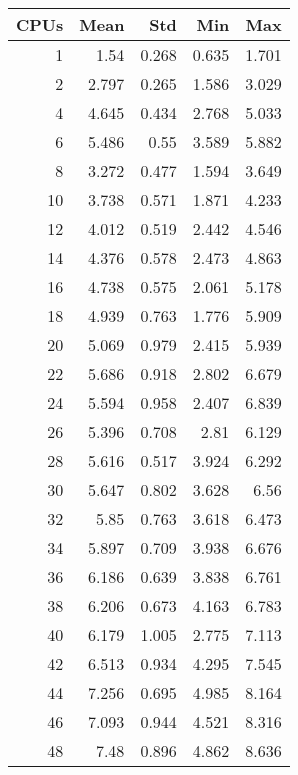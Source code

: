 \begin{table}[htbp]
  \centering
  \begin{minipage}{.45\textwidth}
    \centering
    \scriptsize
\begin{tabular}{rrrrr}
\toprule
\textbf{CPUs} & \textbf{Mean} & \textbf{Std} & \textbf{Min} & \textbf{Max} \\
\midrule
1 & 1.54 & 0.268 & 0.635 & 1.701 \\
2 & 2.797 & 0.265 & 1.586 & 3.029 \\
4 & 4.645 & 0.434 & 2.768 & 5.033 \\
6 & 5.486 & 0.55 & 3.589 & 5.882 \\
8 & 3.272 & 0.477 & 1.594 & 3.649 \\
10 & 3.738 & 0.571 & 1.871 & 4.233 \\
12 & 4.012 & 0.519 & 2.442 & 4.546 \\
14 & 4.376 & 0.578 & 2.473 & 4.863 \\
16 & 4.738 & 0.575 & 2.061 & 5.178 \\
18 & 4.939 & 0.763 & 1.776 & 5.909 \\
20 & 5.069 & 0.979 & 2.415 & 5.939 \\
22 & 5.686 & 0.918 & 2.802 & 6.679 \\
24 & 5.594 & 0.958 & 2.407 & 6.839 \\
26 & 5.396 & 0.708 & 2.81 & 6.129 \\
28 & 5.616 & 0.517 & 3.924 & 6.292 \\
30 & 5.647 & 0.802 & 3.628 & 6.56 \\
32 & 5.85 & 0.763 & 3.618 & 6.473 \\
34 & 5.897 & 0.709 & 3.938 & 6.676 \\
36 & 6.186 & 0.639 & 3.838 & 6.761 \\
38 & 6.206 & 0.673 & 4.163 & 6.783 \\
40 & 6.179 & 1.005 & 2.775 & 7.113 \\
42 & 6.513 & 0.934 & 4.295 & 7.545 \\
44 & 7.256 & 0.695 & 4.985 & 8.164 \\
46 & 7.093 & 0.944 & 4.521 & 8.316 \\
48 & 7.48 & 0.896 & 4.862 & 8.636 \\
\bottomrule
\end{tabular}


\end{minipage}
\end{table}
